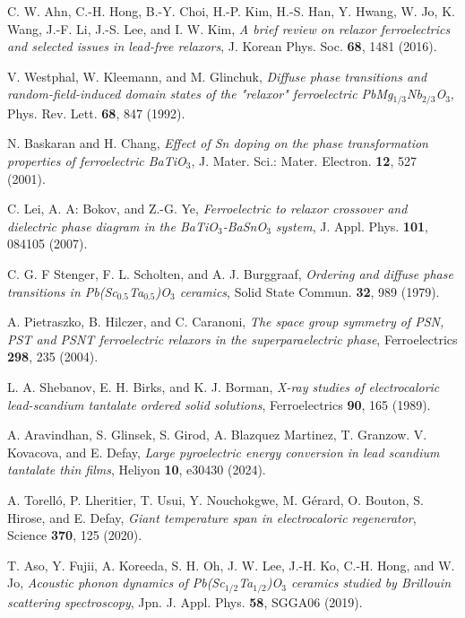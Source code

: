 \documentclass[%
 preprint, %
 amsmath,amssymb,
 aps, physrev,
]{revtex4-2}
\begin{document}
\begin{thebibliography}{99}
 C. W. Ahn, C.-H. Hong, B.-Y. Choi, H.-P. Kim, H.-S. Han, Y. Hwang, W. Jo, K. Wang, J.-F. Li, J.-S. Lee, and I. W. Kim, {\it A brief review on relaxor ferroelectrics and selected issues in lead-free relaxors}, J. Korean Phys. Soc. {\bf 68}, 1481 (2016).

 V. Westphal, W. Kleemann, and M. Glinchuk, {\it Diffuse phase transitions and random-field-induced domain states of the "relaxor" ferroelectric PbMg$_{1/3}$Nb$_{2/3}$O$_3$}, Phys. Rev. Lett. {\bf 68}, 847 (1992).

 N. Baskaran and H. Chang, {\it Effect of Sn doping on the phase transformation properties of ferroelectric BaTiO$_3$}, J. Mater. Sci.: Mater. Electron. {\bf 12}, 527 (2001).

 C. Lei, A. A: Bokov, and Z.-G. Ye, {\it Ferroelectric to relaxor crossover and dielectric phase diagram in the BaTiO$_3$-BaSnO$_3$ system}, J. Appl. Phys. {\bf 101}, 084105 (2007).

 C. G. F Stenger, F. L. Scholten, and A. J. Burggraaf, {\it Ordering and diffuse phase transitions in Pb(Sc$_{0.5}$Ta$_{0.5}$)O$_3$ ceramics}, Solid State Commun. {\bf 32}, 989 (1979).

 A. Pietraszko, B. Hilczer, and C. Caranoni, {\it The space group symmetry of PSN, PST and PSNT ferroelectric relaxors in the superparaelectric phase}, Ferroelectrics {\bf 298}, 235 (2004).

 L. A. Shebanov, E. H. Birks, and K. J. Borman, {\it X-ray studies of electrocaloric lead-scandium tantalate ordered solid solutions}, Ferroelectrics {\bf 90}, 165 (1989).

 A. Aravindhan, S. Glinsek, S. Girod, A. Blazquez Martinez, T. Granzow. V. Kovacova, and E. Defay, {\it Large pyroelectric energy conversion in lead scandium tantalate thin films}, Heliyon {\bf 10}, e30430 (2024).

 A. Torelló, P. Lheritier, T. Usui, Y. Nouchokgwe, M. Gérard, O. Bouton, S. Hirose, and E. Defay, {\it Giant temperature span in electrocaloric regenerator}, Science {\bf 370}, 125 (2020).

 T. Aso, Y. Fujii, A. Koreeda, S. H. Oh, J. W. Lee, J.-H. Ko, C.-H. Hong, and W. Jo, {\it Acoustic phonon dynamics of Pb(Sc$_{1/2}$Ta$_{1/2}$)O$_3$ ceramics studied by Brillouin scattering spectroscopy}, Jpn. J. Appl. Phys. {\bf 58}, SGGA06 (2019).


\end{thebibliography}
\end{document}
